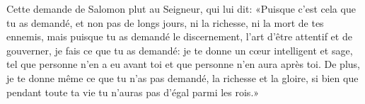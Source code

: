 Cette demande de Salomon plut au Seigneur, qui lui dit:
	«Puisque c’est cela que tu as demandé,
	et non pas de longs jours, ni la richesse, ni la mort de tes ennemis,
	mais puisque tu as demandé le discernement, l’art d’être attentif et de gouverner,
	je fais ce que tu as demandé:
	je te donne un cœur intelligent et sage,
	tel que personne n’en a eu avant toi et que personne n’en aura après toi.
De plus, je te donne même ce que tu n’as pas demandé, la richesse et la gloire,
	si bien que pendant toute ta vie tu n’auras pas d’égal parmi les rois.»
